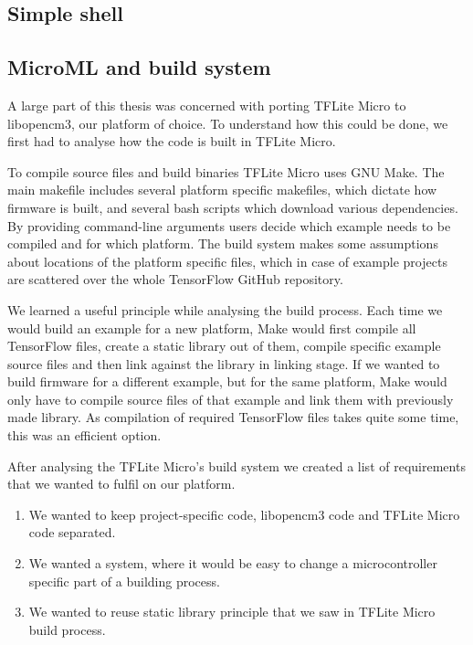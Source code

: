 
\subsection{ Simple shell}

\subsection{ MicroML and build system} \label{build_system_label}

A large part of this thesis was concerned with porting TFLite Micro to libopencm3, our platform of choice.
To understand how this could be done, we first had to analyse how the code is built in TFLite Micro.

To compile source files and build binaries TFLite Micro uses GNU Make.
The main makefile includes several platform specific makefiles, which dictate how firmware is built, and several bash scripts which download various dependencies.
By providing command-line arguments users decide which example needs to be compiled and for which platform.
The build system makes some assumptions about locations of the platform specific files, which in case of example projects are scattered over the whole TensorFlow GitHub repository.

We learned a useful principle while analysing the build process. 
Each time we would build an example for a new platform, Make would first compile all TensorFlow files, create a static library out of them, compile specific example source files and then link against the library in linking stage.
If we wanted to build firmware for a different example, but for the same platform, Make would only have to compile source files of that example and link them with previously made library.
As compilation of required TensorFlow files takes quite some time, this was an efficient option.

After analysing the TFLite Micro's build system we created a list of requirements that we wanted to fulfil on our platform.

\begin{enumerate}
    \item We wanted to keep project-specific code, libopencm3 code and TFLite Micro code separated.
    \item We wanted a system, where it would be easy to change a microcontroller specific part of a building process.
    \item We wanted to reuse static library principle that we saw in TFLite Micro build process.
\end{enumerate}

